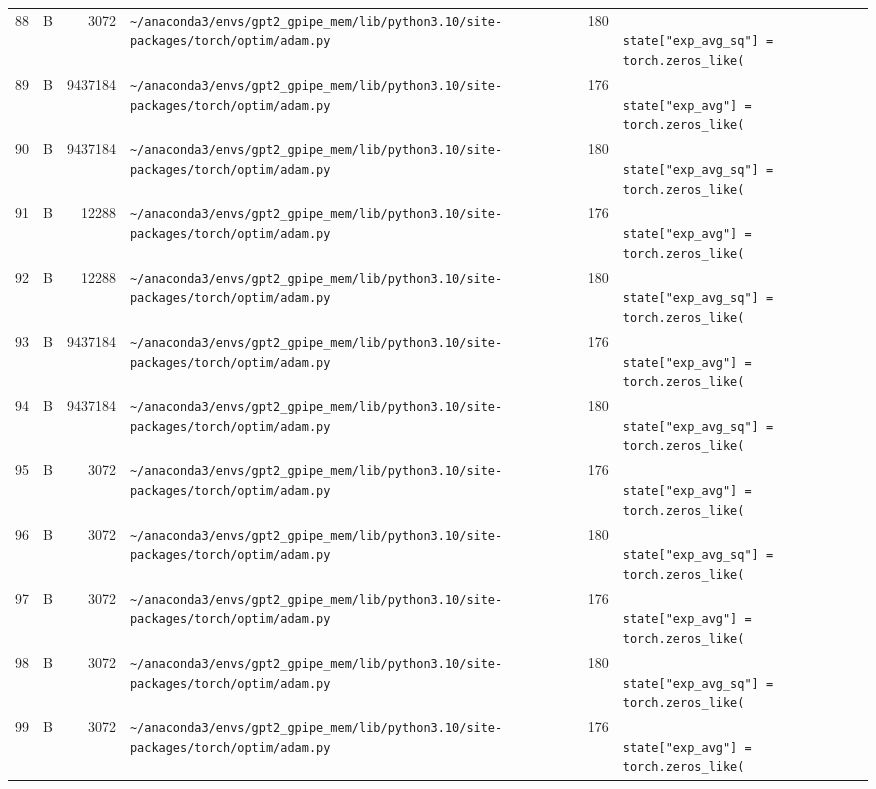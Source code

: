 \documentclass{article}
\begin{document}
\begin{longtable}{r l r p{6.5cm} r p{7.0cm}}
88 & B & 3072 & \lstinline|~/anaconda3/envs/gpt2_gpipe_mem/lib/python3.10/site-packages/torch/optim/adam.py| & 180 & \lstinline|                    state["exp_avg_sq"] = torch.zeros_like(| \\
89 & B & 9437184 & \lstinline|~/anaconda3/envs/gpt2_gpipe_mem/lib/python3.10/site-packages/torch/optim/adam.py| & 176 & \lstinline|                    state["exp_avg"] = torch.zeros_like(| \\
90 & B & 9437184 & \lstinline|~/anaconda3/envs/gpt2_gpipe_mem/lib/python3.10/site-packages/torch/optim/adam.py| & 180 & \lstinline|                    state["exp_avg_sq"] = torch.zeros_like(| \\
91 & B & 12288 & \lstinline|~/anaconda3/envs/gpt2_gpipe_mem/lib/python3.10/site-packages/torch/optim/adam.py| & 176 & \lstinline|                    state["exp_avg"] = torch.zeros_like(| \\
92 & B & 12288 & \lstinline|~/anaconda3/envs/gpt2_gpipe_mem/lib/python3.10/site-packages/torch/optim/adam.py| & 180 & \lstinline|                    state["exp_avg_sq"] = torch.zeros_like(| \\
93 & B & 9437184 & \lstinline|~/anaconda3/envs/gpt2_gpipe_mem/lib/python3.10/site-packages/torch/optim/adam.py| & 176 & \lstinline|                    state["exp_avg"] = torch.zeros_like(| \\
94 & B & 9437184 & \lstinline|~/anaconda3/envs/gpt2_gpipe_mem/lib/python3.10/site-packages/torch/optim/adam.py| & 180 & \lstinline|                    state["exp_avg_sq"] = torch.zeros_like(| \\
95 & B & 3072 & \lstinline|~/anaconda3/envs/gpt2_gpipe_mem/lib/python3.10/site-packages/torch/optim/adam.py| & 176 & \lstinline|                    state["exp_avg"] = torch.zeros_like(| \\
96 & B & 3072 & \lstinline|~/anaconda3/envs/gpt2_gpipe_mem/lib/python3.10/site-packages/torch/optim/adam.py| & 180 & \lstinline|                    state["exp_avg_sq"] = torch.zeros_like(| \\
97 & B & 3072 & \lstinline|~/anaconda3/envs/gpt2_gpipe_mem/lib/python3.10/site-packages/torch/optim/adam.py| & 176 & \lstinline|                    state["exp_avg"] = torch.zeros_like(| \\
98 & B & 3072 & \lstinline|~/anaconda3/envs/gpt2_gpipe_mem/lib/python3.10/site-packages/torch/optim/adam.py| & 180 & \lstinline|                    state["exp_avg_sq"] = torch.zeros_like(| \\
99 & B & 3072 & \lstinline|~/anaconda3/envs/gpt2_gpipe_mem/lib/python3.10/site-packages/torch/optim/adam.py| & 176 & \lstinline|                    state["exp_avg"] = torch.zeros_like(| \\

\end{longtable}
\end{document}
